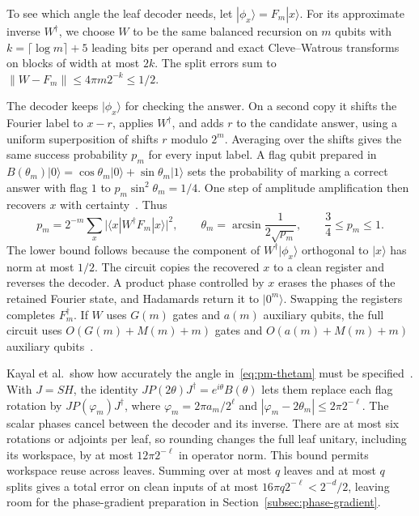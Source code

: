 \documentclass[11pt]{article}
\begin{document}
To see which angle the leaf decoder needs, let $|\phi_x\rangle=F_m|x\rangle$. For its approximate inverse $W^\dagger$, we choose $W$ to be the same balanced recursion on $m$ qubits with $k=\lceil\log m\rceil+5$ leading bits per operand and exact Cleve--Watrous transforms on blocks of width at most $2k$. The split errors sum to $\|W-F_m\|\le 4\pi m2^{-k}\le 1/2$.

The decoder keeps $|\phi_x\rangle$ for checking the answer. On a second copy it shifts the Fourier label to $x-r$, applies $W^\dagger$, and adds $r$ to the candidate answer, using a uniform superposition of shifts $r$ modulo $2^m$. Averaging over the shifts gives the same success probability $p_m$ for every input label. A flag qubit prepared in $B(\theta_m)|0\rangle=\cos\theta_m|0\rangle+\sin\theta_m|1\rangle$ sets the probability of marking a correct answer with flag $1$ to $p_m\sin^2\theta_m=1/4$. One step of amplitude amplification then recovers $x$ with certainty~\cite[Lemmas~2.4 and~3.1]{kmps2026}. Thus
\begin{equation}\label{eq:pm-thetam}
p_m = 2^{-m}\sum_x \bigl|\langle x|W^\dagger F_m|x\rangle\bigr|^2, \qquad
\theta_m = \arcsin\frac{1}{2\sqrt{p_m}}, \qquad
\frac{3}{4}\le p_m\le 1.
\end{equation}
The lower bound follows because the component of $W^\dagger|\phi_x\rangle$ orthogonal to $|x\rangle$ has norm at most $1/2$. The circuit copies the recovered $x$ to a clean register and reverses the decoder. A product phase controlled by $x$ erases the phases of the retained Fourier state, and Hadamards return it to $|0^m\rangle$. Swapping the registers completes $F_m^\dagger$. If $W$ uses $G(m)$ gates and $a(m)$ auxiliary qubits, the full circuit uses $O(G(m)+M(m)+m)$ gates and $O(a(m)+M(m)+m)$ auxiliary qubits~\cite[Lemma~3.1]{kmps2026}.

Kayal et al.\ show how accurately the angle in~\eqref{eq:pm-thetam} must be specified~\cite[Lemma~4.1 and Section~4.2]{kmps2026}. With $J=SH$, the identity $JP(2\theta)J^\dagger=e^{i\theta}B(\theta)$ lets them replace each flag rotation by $JP(\varphi_m)J^\dagger$, where $\varphi_m=2\pi a_m/2^\ell$ and $|\varphi_m-2\theta_m|\le 2\pi 2^{-\ell}$. The scalar phases cancel between the decoder and its inverse. There are at most six rotations or adjoints per leaf, so rounding changes the full leaf unitary, including its workspace, by at most $12\pi 2^{-\ell}$ in operator norm. This bound permits workspace reuse across leaves. Summing over at most $q$ leaves and at most $q$ splits gives a total error on clean inputs of at most $16\pi q2^{-\ell}<2^{-d}/2$, leaving room for the phase-gradient preparation in Section~\ref{subsec:phase-gradient}.
\end{document}
